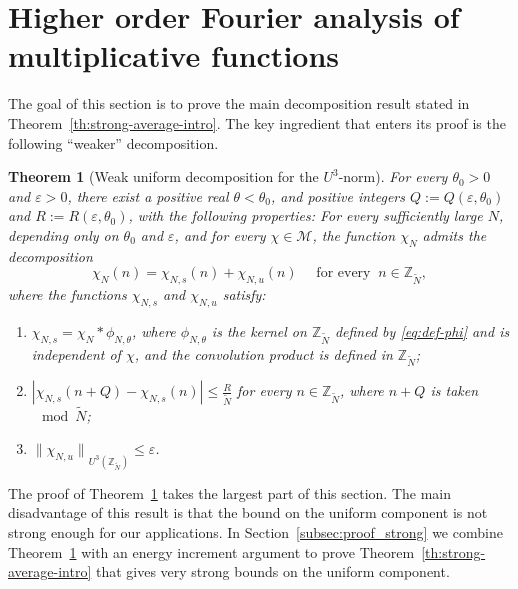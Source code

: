 \documentclass[11pt]{amsart}
\newtheorem{theorem}[lemma]{Theorem}
\theoremstyle{definition}
\begin{document}
\section{Higher order Fourier analysis of multiplicative functions}\label{S:U^3}
  The goal of
this  section is to  prove the main  decomposition result stated in
Theorem~\ref{th:strong-average-intro}. The key ingredient that
enters its proof is the following ``weaker'' decomposition.
\begin{theorem}[Weak uniform decomposition for the $U^3$-norm]
\label{th:Decomposition-weakU3-intro} For every $\theta_0>0$ and
${\varepsilon}>0$, there exist  a positive real $\theta<\theta_0$, and
positive integers  $Q:=Q({\varepsilon},\theta_0)$  and
$R:=R({\varepsilon},\theta_0)$, with the following properties: For
 every  sufficiently large $N$, depending only on  $\theta_0$ and  ${\varepsilon}$,  and for  every $\chi\in{{\mathcal M}}$, the function $\chi_N$ admits
the decomposition
$$
 \chi_N(n)=\chi_{N,s}(n)+\chi_{N,u}(n) \quad \text{ for every }\  n\in
 {{{\mathbb Z}}_{\widetilde N}},
$$
 where  the functions $\chi_{N,s}$ and $\chi_{N,u}$  satisfy:
\begin{enumerate}
\item
\label{it:weakU3-1} {\rule{0mm}{5mm}} $\chi_{N,s}=\chi_N*\phi_{N,\theta}$, where
$\phi_{N,\theta}$ is the  kernel on ${{\mathbb Z}}_{{\widetilde N}}$ defined  by
\eqref{eq:def-phi} and is independent of $\chi$, and
  the convolution product is  defined in ${{{\mathbb Z}}_{\widetilde N}}$;
\item\label{it:weakU3-2}
 $\displaystyle|\chi_{N,s}(n+Q)-\chi_{N,s}(n)|\leq \frac R{{\widetilde N}}$ for every $n\in
{{\mathbb Z}}_{{\widetilde N}}$, where  $n+Q$ is taken $\!\!\! \mod {{\widetilde N}}$;
\item
\label{it:weakU3_3}
{\rule{0mm}{5mm}} ${\lVert {\chi_{N,u}} \rVert}_{U^3({{{\mathbb Z}}_{\widetilde N}})}\leq{\varepsilon}$.
\end{enumerate}
\end{theorem}
The proof of Theorem~\ref{th:Decomposition-weakU3-intro}  takes the
largest part of this section. The main disadvantage of this result
is that  the bound on the
  uniform component  is not strong enough for our applications. In
  Section~\ref{subsec:proof_strong} we
  combine  Theorem~\ref{th:Decomposition-weakU3-intro} with  an energy increment
   argument to prove Theorem~\ref{th:strong-average-intro} that gives very strong bounds on the uniform component.
\end{document}
